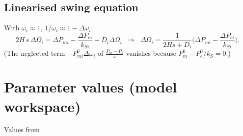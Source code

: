 \documentclass[11pt,a4paper]{article}
\numberwithin{equation}{section}
\begin{document}
\subsection{Linearised swing equation}
With $\omega_i\approx 1$, $1/\omega_i \approx 1-\Delta\omega_i$:
\begin{equation}
2H\,s\,\Delta\Omega_i = \Delta P_{mi} - \frac{\Delta P_{ei}}{k_{Si}} - D_i\Delta\Omega_i
\;\;\Longrightarrow\;\;
\Delta\Omega_i = \frac{1}{2Hs + D_i}\Big(\Delta P_{mi}-\frac{\Delta P_{ei}}{k_{Si}}\Big).
\end{equation}
(The neglected term $-P_{mi}^0\Delta\omega_i$ of $\frac{P_m-P_e}{\omega}$ vanishes because $P_m^0 - P_e^0/k_S = 0$.)

\section*{Parameter values (model workspace)}
%
\noindent Values from \cite[Tables~2, 5--7]{RA2021access}.
\end{document}
